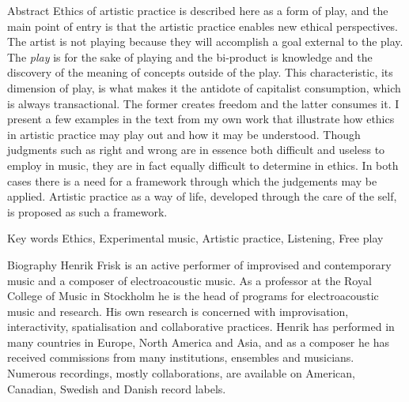 \documentclass[presentation]{beamer}
\begin{document}
\begin{frame}[label={sec:org4352872}]{Abstract}
Ethics of artistic practice is described here as a form of play, and the main point of entry is that the artistic practice enables new ethical perspectives. The artist is not playing because they will accomplish a goal external to the play. The \emph{play} is for the sake of playing and the bi-product is knowledge and the discovery of the meaning of concepts outside of the play. This characteristic, its dimension of play, is what makes it the antidote of capitalist consumption, which is always transactional. The former creates freedom and the latter consumes it. I present a few examples in the text from my own work that illustrate how ethics in artistic practice may play out and how it may be understood. Though judgments such as right and wrong are in essence both difficult and useless to employ in music, they are in fact equally difficult to determine in ethics. In both cases there is a need for a framework through which the judgements may be applied. Artistic practice as a way of life, developed through the care of the self, is proposed as such a framework.
\end{frame}
\begin{frame}[label={sec:orgf15e9c5}]{Key words}
Ethics, Experimental music, Artistic practice, Listening, Free play
\end{frame}
\begin{frame}[label={sec:org6264be6}]{Biography}
Henrik Frisk is an active performer of improvised and contemporary music and a composer of electroacoustic music. As a professor at the Royal College of Music in Stockholm he is the head of programs for electroacoustic music and research. His own research is concerned with improvisation, interactivity, spatialisation and collaborative practices. Henrik has performed in many countries in Europe, North America and Asia, and as a composer he has received commissions from many institutions, ensembles and musicians. Numerous recordings, mostly collaborations, are available on American, Canadian, Swedish and Danish record labels.
\end{frame}
\end{document}
